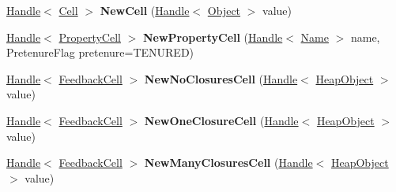 \begin{DoxyCompactItemize}
\item 
\mbox{\label{classv8_1_1internal_1_1Factory_a9bfdb7b0d208bd2f586c940031585db3}} 
\mbox{\hyperlink{classv8_1_1internal_1_1Handle}{Handle}}$<$ \mbox{\hyperlink{classv8_1_1internal_1_1Cell}{Cell}} $>$ {\bfseries New\+Cell} (\mbox{\hyperlink{classv8_1_1internal_1_1Handle}{Handle}}$<$ \mbox{\hyperlink{classv8_1_1internal_1_1Object}{Object}} $>$ value)
\item 
\mbox{\label{classv8_1_1internal_1_1Factory_aa696f7820870d0dfdff06b50b5203c55}} 
\mbox{\hyperlink{classv8_1_1internal_1_1Handle}{Handle}}$<$ \mbox{\hyperlink{classv8_1_1internal_1_1PropertyCell}{Property\+Cell}} $>$ {\bfseries New\+Property\+Cell} (\mbox{\hyperlink{classv8_1_1internal_1_1Handle}{Handle}}$<$ \mbox{\hyperlink{classv8_1_1internal_1_1Name}{Name}} $>$ name, Pretenure\+Flag pretenure=T\+E\+N\+U\+R\+ED)
\item 
\mbox{\label{classv8_1_1internal_1_1Factory_a116d0d0c96f64c1c60da0a918dc89d7e}} 
\mbox{\hyperlink{classv8_1_1internal_1_1Handle}{Handle}}$<$ \mbox{\hyperlink{classv8_1_1internal_1_1FeedbackCell}{Feedback\+Cell}} $>$ {\bfseries New\+No\+Closures\+Cell} (\mbox{\hyperlink{classv8_1_1internal_1_1Handle}{Handle}}$<$ \mbox{\hyperlink{classv8_1_1internal_1_1HeapObject}{Heap\+Object}} $>$ value)
\item 
\mbox{\label{classv8_1_1internal_1_1Factory_a0ca1fd4198102c377110962ce793eb56}} 
\mbox{\hyperlink{classv8_1_1internal_1_1Handle}{Handle}}$<$ \mbox{\hyperlink{classv8_1_1internal_1_1FeedbackCell}{Feedback\+Cell}} $>$ {\bfseries New\+One\+Closure\+Cell} (\mbox{\hyperlink{classv8_1_1internal_1_1Handle}{Handle}}$<$ \mbox{\hyperlink{classv8_1_1internal_1_1HeapObject}{Heap\+Object}} $>$ value)
\item 
\mbox{\label{classv8_1_1internal_1_1Factory_a3d9a5ab42e1cec0efba0b32d21793863}} 
\mbox{\hyperlink{classv8_1_1internal_1_1Handle}{Handle}}$<$ \mbox{\hyperlink{classv8_1_1internal_1_1FeedbackCell}{Feedback\+Cell}} $>$ {\bfseries New\+Many\+Closures\+Cell} (\mbox{\hyperlink{classv8_1_1internal_1_1Handle}{Handle}}$<$ \mbox{\hyperlink{classv8_1_1internal_1_1HeapObject}{Heap\+Object}} $>$ value)
\item 

\end{DoxyCompactItemize}
